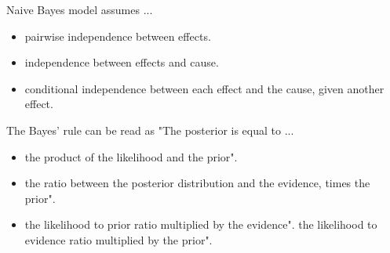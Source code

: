 \documentclass[11pt, a4paper]{article}
\begin{document}
Naive Bayes model assumes ... 
\begin{itemize}
    \solitem pairwise conditional independence between effects given the cause.
    \item pairwise independence between effects.
    \item independence between effects and cause.
    \item conditional independence between each effect and the cause, given another effect.
\end{itemize}

The Bayes' rule can be read as "The posterior is equal to ... 
\begin{itemize}
    \item the product of the likelihood and the prior".
    \item the ratio between the posterior distribution and the evidence, times the prior".
    \item the likelihood to prior ratio multiplied by the evidence".
    \solitem the likelihood to evidence ratio multiplied by the prior".
\end{itemize}
\end{document}
